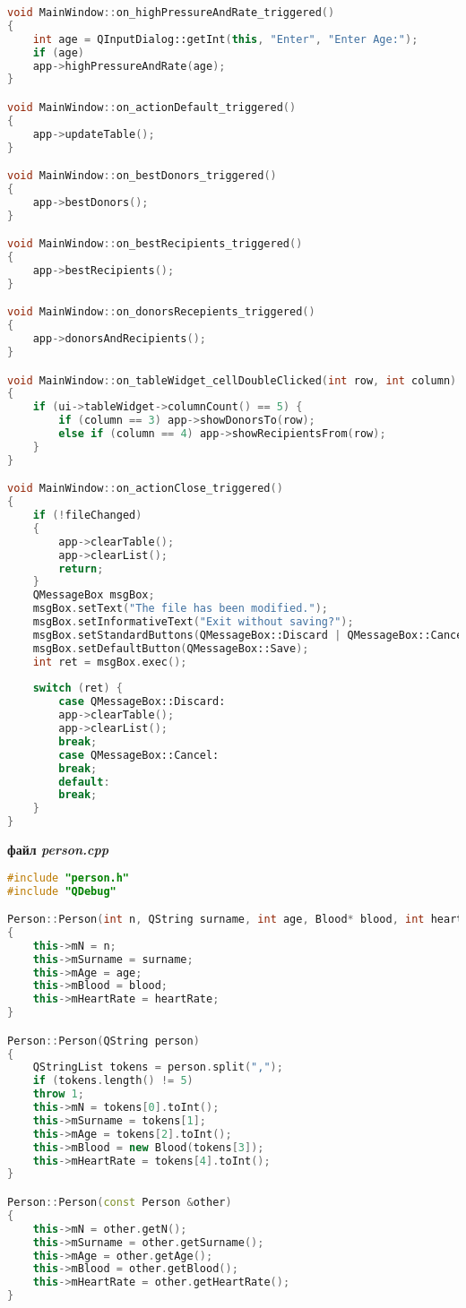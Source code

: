 \documentclass[oneside,14pt]{extarticle}
\begin{document}
\begin{small}
\begin{lstlisting}[language=c++]
void MainWindow::on_highPressureAndRate_triggered()
{
	int age = QInputDialog::getInt(this, "Enter", "Enter Age:");
	if (age)
	app->highPressureAndRate(age);
}

void MainWindow::on_actionDefault_triggered()
{
	app->updateTable();
}

void MainWindow::on_bestDonors_triggered()
{
	app->bestDonors();
}

void MainWindow::on_bestRecipients_triggered()
{
	app->bestRecipients();
}

void MainWindow::on_donorsRecepients_triggered()
{
	app->donorsAndRecipients();
}

void MainWindow::on_tableWidget_cellDoubleClicked(int row, int column)
{
	if (ui->tableWidget->columnCount() == 5) {
		if (column == 3) app->showDonorsTo(row);
		else if (column == 4) app->showRecipientsFrom(row);
	}
}

void MainWindow::on_actionClose_triggered()
{
	if (!fileChanged)
	{
		app->clearTable();
		app->clearList();
		return;
	}
	QMessageBox msgBox;
	msgBox.setText("The file has been modified.");
	msgBox.setInformativeText("Exit without saving?");
	msgBox.setStandardButtons(QMessageBox::Discard | QMessageBox::Cancel);
	msgBox.setDefaultButton(QMessageBox::Save);
	int ret = msgBox.exec();
	
	switch (ret) {
		case QMessageBox::Discard:
		app->clearTable();
		app->clearList();
		break;
		case QMessageBox::Cancel:
		break;
		default:
		break;
	}
}

\end{lstlisting}

\textbf{файл \textit{person.cpp}}
\begin{lstlisting}[language=c++]
#include "person.h"
#include "QDebug"

Person::Person(int n, QString surname, int age, Blood* blood, int heartRate)
{
	this->mN = n;
	this->mSurname = surname;
	this->mAge = age;
	this->mBlood = blood;
	this->mHeartRate = heartRate;
}

Person::Person(QString person)
{
	QStringList tokens = person.split(",");
	if (tokens.length() != 5)
	throw 1;
	this->mN = tokens[0].toInt();
	this->mSurname = tokens[1];
	this->mAge = tokens[2].toInt();
	this->mBlood = new Blood(tokens[3]);
	this->mHeartRate = tokens[4].toInt();
}

Person::Person(const Person &other)
{
	this->mN = other.getN();
	this->mSurname = other.getSurname();
	this->mAge = other.getAge();
	this->mBlood = other.getBlood();
	this->mHeartRate = other.getHeartRate();
}


\end{lstlisting}
\end{small}
\end{document}
